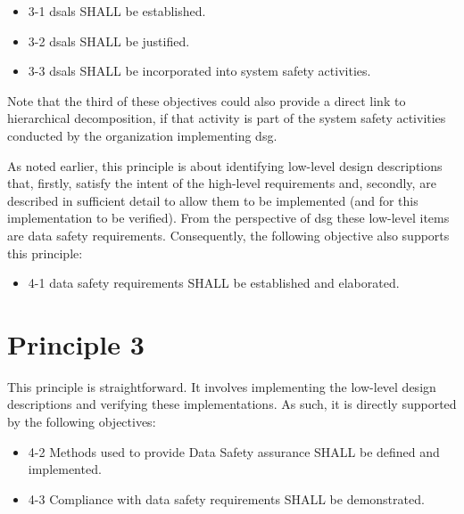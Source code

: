 \begin{itemize}
	\item \textcolor{dsiwgAccentColour}{3-1} \Glspl{dsal} SHALL be established.
	\item \textcolor{dsiwgAccentColour}{3-2} \Glspl{dsal} SHALL be justified.
	\item \textcolor{dsiwgAccentColour}{3-3} \Glspl{dsal} SHALL be incorporated into system safety activities.
\end{itemize}

Note that the third of these objectives could also provide a direct link to hierarchical decomposition, if that activity is part of the system safety activities conducted by the organization implementing \gls{dsg}.

As noted earlier, this principle is about identifying low-level design descriptions that, firstly, satisfy the intent of the high-level requirements and, secondly, are described in sufficient detail to allow them to be implemented (and for this implementation to be verified). From the perspective of \gls{dsg} these low-level items are \glspl{data safety requirement}. Consequently, the following objective also supports this principle:

\begin{itemize}
	\item \textcolor{dsiwgAccentColour}{4-1} \Glspl{data safety requirement} SHALL be established and elaborated.
\end{itemize}


\section{Principle 3}

This principle is straightforward. It involves implementing the low-level design descriptions and verifying these implementations. As such, it is directly supported by the following objectives:

\begin{itemize}
	\item \textcolor{dsiwgAccentColour}{4-2} Methods used to provide Data Safety assurance SHALL be defined and implemented.
	\item \textcolor{dsiwgAccentColour}{4-3} Compliance with \glspl{data safety requirement} SHALL be demonstrated.	
\end{itemize}


